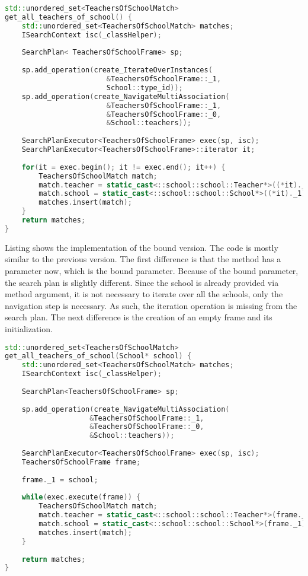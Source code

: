 \begin{lstlisting}[frame=single,float=!ht,language=C++,
label=listing:tos_query_gaub, caption=The contents of
\emph{schoolQueries.h}] 
std::unordered_set<TeachersOfSchoolMatch>
get_all_teachers_of_school() { 
	std::unordered_set<TeachersOfSchoolMatch> matches;
	ISearchContext isc(_classHelper);
	
	SearchPlan< TeachersOfSchoolFrame> sp;
	
	sp.add_operation(create_IterateOverInstances(
						&TeachersOfSchoolFrame::_1,
						School::type_id));
	sp.add_operation(create_NavigateMultiAssociation(
						&TeachersOfSchoolFrame::_1,
						&TeachersOfSchoolFrame::_0, 
						&School::teachers)); 
	
	SearchPlanExecutor<TeachersOfSchoolFrame> exec(sp, isc);
	SearchPlanExecutor<TeachersOfSchoolFrame>::iterator it;
	
	for(it = exec.begin(); it != exec.end(); it++) {
		TeachersOfSchoolMatch match;	
		match.teacher = static_cast<::school::school::Teacher*>((*it)._0);
		match.school = static_cast<::school::school::School*>((*it)._1);
		matches.insert(match);
	}
	return matches;
}
\end{lstlisting}

Listing  shows the implementation of the bound version.
The code is mostly similar to the previous version. The first difference is that
the method has a parameter now, which is the bound parameter. Because of the
bound parameter, the search plan is slightly different. Since the school is
already provided via method argument, it is not necessary to iterate over all
the schools, only the navigation step is necessary. As such, the iteration
operation is missing from the search plan. The next difference is the creation
of an empty frame and its initialization. 

\begin{lstlisting}[frame=single,float=!ht,language=C++,
label=listing:tos_query_gab, caption=The contents of
\emph{schoolQueries.h}]
std::unordered_set<TeachersOfSchoolMatch>
get_all_teachers_of_school(School* school) { 
	std::unordered_set<TeachersOfSchoolMatch> matches;
	ISearchContext isc(_classHelper);
	
	SearchPlan<TeachersOfSchoolFrame> sp;
	
	sp.add_operation(create_NavigateMultiAssociation(
					&TeachersOfSchoolFrame::_1,
					&TeachersOfSchoolFrame::_0,
					&School::teachers));
	
	SearchPlanExecutor<TeachersOfSchoolFrame> exec(sp, isc);
	TeachersOfSchoolFrame frame;
	
	frame._1 = school;
	
	while(exec.execute(frame)) {
		TeachersOfSchoolMatch match;	
		match.teacher = static_cast<::school::school::Teacher*>(frame._0);
		match.school = static_cast<::school::school::School*>(frame._1);
		matches.insert(match);
	}
	
	return matches;
}
\end{lstlisting}

